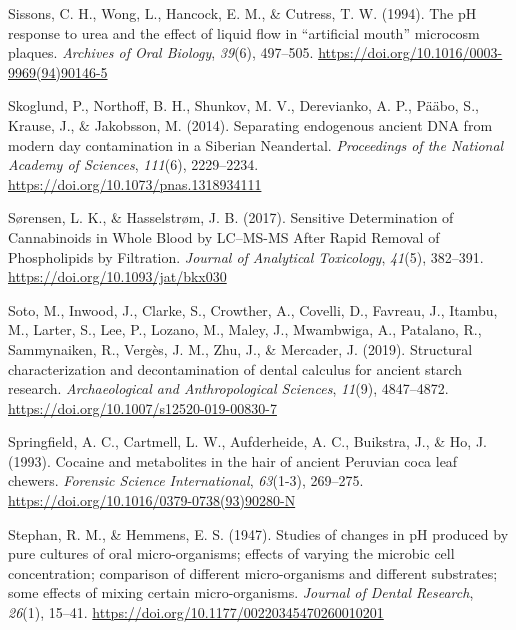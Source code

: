 \documentclass[
  letterpaper,
]{book}
\newlength{\cslhangindent}
\newlength{\cslentryspacingunit} %
\newenvironment{CSLReferences}[2] %
 {%
  \setlength{\parindent}{0pt}
  \ifodd #1
  \let\oldpar\par
  \def\par{\hangindent=\cslhangindent\oldpar}
  \fi
  \setlength{\parskip}{#2\cslentryspacingunit}
 }%
 {}
\begin{document}
\begin{CSLReferences}{1}{0}
\leavevmode{}%
Sissons, C. H., Wong, L., Hancock, E. M., \& Cutress, T. W. (1994). The
{pH} response to urea and the effect of liquid flow in {``artificial
mouth''} microcosm plaques. \emph{Archives of Oral Biology},
\emph{39}(6), 497--505.
\url{https://doi.org/10.1016/0003-9969(94)90146-5}

\leavevmode{}%
Skoglund, P., Northoff, B. H., Shunkov, M. V., Derevianko, A. P., Pääbo,
S., Krause, J., \& Jakobsson, M. (2014). Separating endogenous ancient
{DNA} from modern day contamination in a {Siberian Neandertal}.
\emph{Proceedings of the National Academy of Sciences}, \emph{111}(6),
2229--2234. \url{https://doi.org/10.1073/pnas.1318934111}

\leavevmode{}%
Sørensen, L. K., \& Hasselstrøm, J. B. (2017). Sensitive {Determination}
of {Cannabinoids} in {Whole Blood} by {LC}--{MS-MS After Rapid Removal}
of {Phospholipids} by {Filtration}. \emph{Journal of Analytical
Toxicology}, \emph{41}(5), 382--391.
\url{https://doi.org/10.1093/jat/bkx030}

\leavevmode{}%
Soto, M., Inwood, J., Clarke, S., Crowther, A., Covelli, D., Favreau,
J., Itambu, M., Larter, S., Lee, P., Lozano, M., Maley, J., Mwambwiga,
A., Patalano, R., Sammynaiken, R., Vergès, J. M., Zhu, J., \& Mercader,
J. (2019). Structural characterization and decontamination of dental
calculus for ancient starch research. \emph{Archaeological and
Anthropological Sciences}, \emph{11}(9), 4847--4872.
\url{https://doi.org/10.1007/s12520-019-00830-7}

\leavevmode{}%
Springfield, A. C., Cartmell, L. W., Aufderheide, A. C., Buikstra, J.,
\& Ho, J. (1993). Cocaine and metabolites in the hair of ancient
{Peruvian} coca leaf chewers. \emph{Forensic Science International},
\emph{63}(1-3), 269--275.
\url{https://doi.org/10.1016/0379-0738(93)90280-N}

\leavevmode{}%
Stephan, R. M., \& Hemmens, E. S. (1947). Studies of changes in {pH}
produced by pure cultures of oral micro-organisms; effects of varying
the microbic cell concentration; comparison of different micro-organisms
and different substrates; some effects of mixing certain
micro-organisms. \emph{Journal of Dental Research}, \emph{26}(1),
15--41. \url{https://doi.org/10.1177/00220345470260010201}


\end{CSLReferences}
\end{document}
